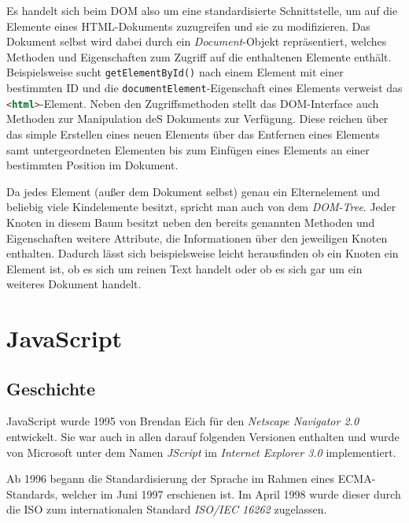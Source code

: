 Es handelt sich beim DOM also um eine standardisierte Schnittstelle, um auf die Elemente eines
HTML-Dokuments zuzugreifen und sie zu modifizieren. Das Dokument selbst wird dabei durch ein
\emph{Document}-Objekt repräsentiert, welches Methoden und Eigenschaften zum Zugriff auf die
enthaltenen Elemente enthält. Beispielsweise sucht \lstinline{getElementById()} nach
einem Element mit einer bestimmten ID und die \lstinline{documentElement}-Eigenschaft eines Elements
verweist das \lstinline[language=HTML]{<html>}-Element. Neben den Zugriffsmethoden stellt das
DOM-Interface auch Methoden zur Manipulation deS Dokuments zur Verfügung. Diese reichen über das
simple Erstellen eines neuen Elements über das Entfernen eines Elements samt untergeordneten
Elementen bis zum Einfügen eines Elements an einer bestimmten Position im Dokument.

Da jedes Element (außer dem Dokument selbst) genau ein Elternelement und beliebig viele Kindelemente
besitzt, spricht man auch von dem \emph{DOM-Tree}. Jeder Knoten in diesem Baum besitzt neben den
bereits genannten Methoden und Eigenschaften weitere Attribute, die Informationen über den
jeweiligen Knoten enthalten. Dadurch lässt sich beispielsweise leicht herausfinden ob ein Knoten ein
Element ist, ob es sich um reinen Text handelt oder ob es sich gar um ein weiteres Dokument handelt.







\section{JavaScript}

\subsection{Geschichte}

JavaScript wurde 1995 von Brendan Eich für den \emph{Netscape Navigator 2.0} entwickelt. Sie war auch
in allen darauf folgenden Versionen enthalten und wurde von Microsoft unter dem Namen \emph{JScript}
im \emph{Internet Explorer 3.0} implementiert.

Ab 1996 begann die Standardisierung der Sprache im Rahmen eines ECMA-Standards, welcher im Juni 1997
erschienen ist. Im April 1998 wurde dieser durch die ISO zum internationalen Standard \emph{ISO/IEC
16262} zugelassen.

